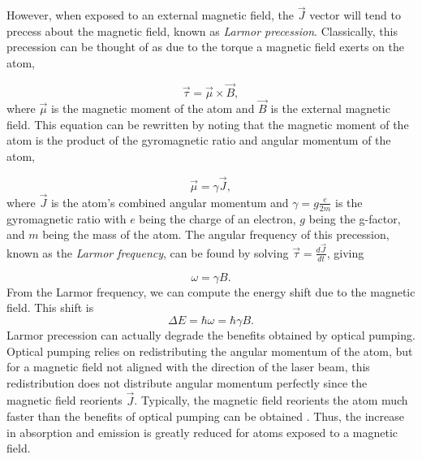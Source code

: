 \documentclass[]{revtex4}
\begin{document}
However, when exposed to an external magnetic field, the $\vec J$ vector will tend to precess about the magnetic field, known as \textit{Larmor precession}. Classically, this precession can be thought of as due to the torque a magnetic field exerts on the atom,

\begin{equation}
  \vec \tau = \vec \mu \times \vec B,
  \label{larmortorque}
\end{equation}
%
where $\vec \mu$ is the magnetic moment of the atom and $\vec B$ is the external magnetic field. This equation can be rewritten by noting that the magnetic moment of the atom is the product of the gyromagnetic ratio and angular momentum of the atom,

\begin{equation}
  \vec \mu = \gamma \vec J,
  \label{magneticmoment}
\end{equation}
%
where $\vec J$ is the atom's combined angular momentum and $\gamma = g\frac{e}{2m}$ is the gyromagnetic ratio with $e$ being the charge of an electron, $g$ being the g-factor, and $m$ being the mass of the atom.
%
%
The angular frequency of this precession, known as the \textit{Larmor frequency}, can be found by solving $\vec \tau = \frac{d\vec J}{dt}$, giving

\begin{equation}
  \omega = \gamma B.
  \label{larmorfrequency}
\end{equation}
%
From the Larmor frequency, we can compute the energy shift due to the magnetic field. This shift is
\begin{equation}
		\Delta E = \hbar \omega = \hbar \gamma B.
		\label{ehw}
\end{equation}
%
Larmor precession can actually degrade the benefits obtained by optical pumping. Optical pumping relies on redistributing the angular momentum of the atom, but for a magnetic field not aligned with the direction of the laser beam, this redistribution does not distribute angular momentum perfectly since the magnetic field reorients $\vec J$. Typically, the magnetic field reorients the atom much faster than the benefits of optical pumping can be obtained \cite{Kane2014}. Thus, the increase in absorption and emission is greatly reduced for atoms exposed to a magnetic field.


\end{document}
